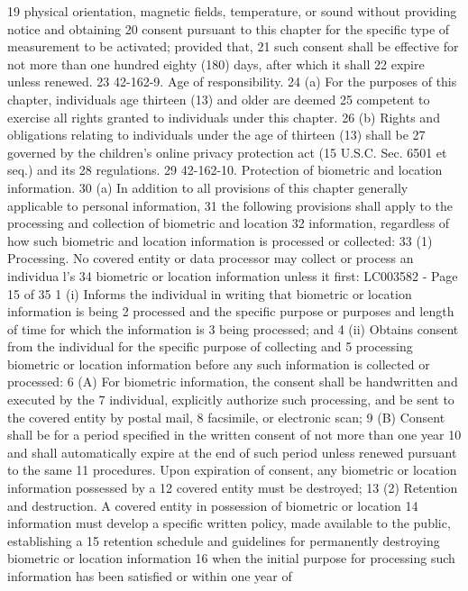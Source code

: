 19 physical orientation, magnetic fields, temperature, or sound without providing notice and obtaining
20 consent pursuant to this chapter for the specific type of measurement to be activated; provided that,
21 such consent shall be effective for not more than one hundred eighty (180) days, after which it shall
22 expire unless renewed.
23 42-162-9. Age of responsibility.
24 (a) For the purposes of this chapter, individuals age thirteen (13) and older are deemed
25 competent to exercise all rights granted to individuals under this chapter.
26 (b) Rights and obligations relating to individuals under the age of thirteen (13) shall be
27 governed by the children's online privacy protection act (15 U.S.C. Sec. 6501 et seq.) and its
28 regulations.
29 42-162-10. Protection of biometric and location information.
30 (a) In addition to all provisions of this chapter generally applicable to personal information,
31 the following provisions shall apply to the processing and collection of biometric and location
32 information, regardless of how such biometric and location information is processed or collected:
33 (1) Processing. No covered entity or data processor may collect or process an individua l's
34 biometric or location information unless it first:
LC003582 - Page 15 of 35
1 (i) Informs the individual in writing that biometric or location information is being
2 processed and the specific purpose or purposes and length of time for which the information is
3 being processed; and
4 (ii) Obtains consent from the individual for the specific purpose of collecting and
5 processing biometric or location information before any such information is collected or processed:
6 (A) For biometric information, the consent shall be handwritten and executed by the
7 individual, explicitly authorize such processing, and be sent to the covered entity by postal mail,
8 facsimile, or electronic scan;
9 (B) Consent shall be for a period specified in the written consent of not more than one year
10 and shall automatically expire at the end of such period unless renewed pursuant to the same
11 procedures. Upon expiration of consent, any biometric or location information possessed by a
12 covered entity must be destroyed;
13 (2) Retention and destruction. A covered entity in possession of biometric or location
14 information must develop a specific written policy, made available to the public, establishing a
15 retention schedule and guidelines for permanently destroying biometric or location information
16 when the initial purpose for processing such information has been satisfied or within one year of
